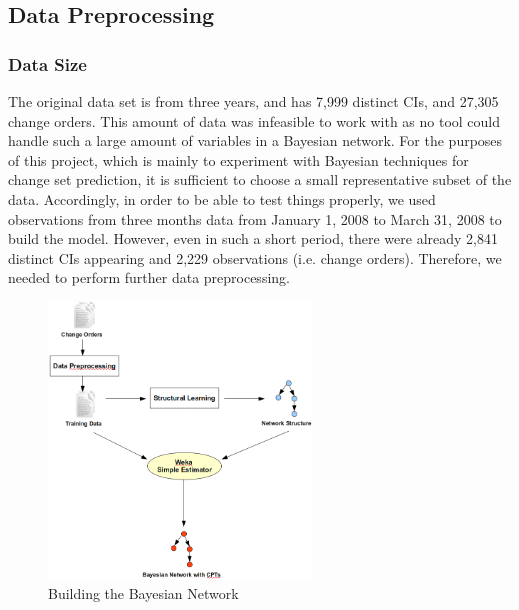 \documentclass{article}
\begin{document}
\subsection{Data Preprocessing}
\label{sec:data}

\subsubsection*{Data Size}
The original data set is from three years, and has 7,999 distinct CIs, and 27,305 change orders. This amount of data was infeasible to work with as no tool
could handle such a large amount of variables in a Bayesian network. For the purposes of this project, which is mainly to experiment with Bayesian techniques
for change set prediction,
it is sufficient to choose a small representative subset of the data. Accordingly, in order to be able to test things properly, we used observations from three
months data from January 1, 2008 to March 31, 2008 to build the model. However, even in such a short period, there were already 2,841 distinct CIs appearing and
2,229 observations (i.e. change orders). Therefore, we needed to perform further data preprocessing. 

\begin{figure}[!t]
\centering
\includegraphics[width=7cm]{graphics/constructingmodel.png}
\caption{Building the Bayesian Network}
\label{fig:process}
\end{figure}
\end{document}

